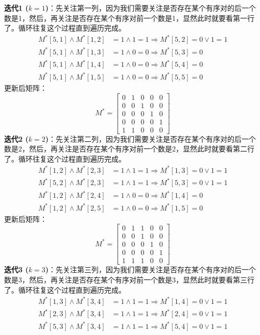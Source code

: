 \documentclass[lang=cn,11pt]{elegantbook}
\begin{document}
\textbf{迭代1 ($k=1$)}：先关注第一列，因为我们需要关注是否存在某个有序对的后一个数是1，然后，再关注是否存在某个有序对前一个数是1，显然此时就要看第一行了。循环往复这个过程直到遍历完成。
\begin{align*}
M^*[5,1] \land M^*[1,2] &= 1 \land 1 = 1 \Rightarrow M^*[5,2] = 0 \lor 1 = 1 \\
M^*[5,1] \land M^*[1,3] &= 1 \land 0 = 0 \Rightarrow M^*[5,3] = 0 \\
M^*[5,1] \land M^*[1,4] &= 1 \land 0 = 0 \Rightarrow M^*[5,4] = 0 \\
M^*[5,1] \land M^*[1,5] &= 1 \land 0 = 0 \Rightarrow M^*[5,5] = 0
\end{align*}
更新后矩阵：
\[
M^* = \begin{bmatrix}
0 & 1 & 0 & 0 & 0 \\
0 & 0 & 1 & 0 & 0 \\
0 & 0 & 0 & 1 & 0 \\
0 & 0 & 0 & 0 & 1 \\
1 & 1 & 0 & 0 & 0
\end{bmatrix}
\]
\textbf{迭代2 ($k=2$)}：先关注第二列，因为我们需要关注是否存在某个有序对的后一个数是2，然后，再关注是否存在某个有序对前一个数是2，显然此时就要看第二行了。循环往复这个过程直到遍历完成。
\begin{align*}
M^*[1,2] \land M^*[2,3] &= 1 \land 1 = 1 \Rightarrow M^*[1,3] = 0 \lor 1 = 1 \\
M^*[5,2] \land M^*[2,3] &= 1 \land 1 = 1 \Rightarrow M^*[5,3] = 0 \lor 1 = 1 \\
M^*[1,2] \land M^*[2,4] &= 1 \land 0 = 0 \Rightarrow M^*[1,4] = 0 \\
M^*[1,2] \land M^*[2,5] &= 1 \land 0 = 0 \Rightarrow M^*[1,5] = 0
\end{align*}
更新后矩阵：
\[
M^* = \begin{bmatrix}
0 & 1 & 1 & 0 & 0 \\
0 & 0 & 1 & 0 & 0 \\
0 & 0 & 0 & 1 & 0 \\
0 & 0 & 0 & 0 & 1 \\
1 & 1 & 1 & 0 & 0
\end{bmatrix}
\]
\textbf{迭代3 ($k=3$)}：先关注第三列，因为我们需要关注是否存在某个有序对的后一个数是3，然后，再关注是否存在某个有序对前一个数是3，显然此时就要看第三行了。循环往复这个过程直到遍历完成。
\begin{align*}
M^*[1,3] \land M^*[3,4] &= 1 \land 1 = 1 \Rightarrow M^*[1,4] = 0 \lor 1 = 1 \\
M^*[2,3] \land M^*[3,4] &= 1 \land 1 = 1 \Rightarrow M^*[2,4] = 0 \lor 1 = 1 \\
M^*[5,3] \land M^*[3,4] &= 1 \land 1 = 1 \Rightarrow M^*[5,4] = 0 \lor 1 = 1
\end{align*}
\end{document}
